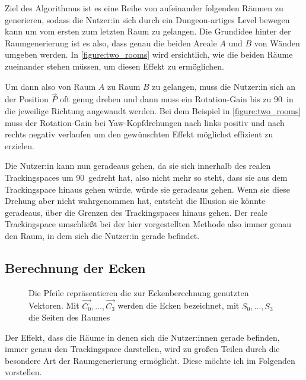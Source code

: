 Ziel des Algorithmus ist es eine Reihe von aufeinander folgenden Räumen zu generieren, sodass die Nutzer:in sich durch ein Dungeon-artiges Level bewegen kann um vom ersten zum letzten Raum zu gelangen.
Die Grundidee hinter der Raumgenerierung ist es also, dass genau die beiden Areale $A$ und $B$ von Wänden umgeben werden. %
In \autoref{figure:two_rooms} wird ersichtlich, wie die beiden Räume zueinander stehen müssen, um diesen Effekt zu ermöglichen.

Um dann also von Raum $A$ zu Raum $B$ zu gelangen, muss die Nutzer:in sich an der Position $\vec{P}$ oft genug drehen und dann muss ein Rotation-Gain bis zu 90\textdegree\ in die jeweilige Richtung angewandt werden. Bei dem Beispiel in \autoref{figure:two_rooms} muss der Rotation-Gain bei Yaw-Kopfdrehungen nach links positiv und nach rechts negativ verlaufen um den gewünschten Effekt möglichst effizient zu erzielen.

Die Nutzer:in kann nun geradeaus gehen, da sie sich innerhalb des realen Trackingspaces um 90\textdegree\ gedreht hat, also nicht mehr so steht, dass sie aus dem Trackingspace hinaus gehen würde, würde sie geradeaus gehen. Wenn sie diese Drehung aber nicht wahrgenommen hat, entsteht die Illusion sie könnte geradeaus, über die Grenzen des Trackingspaces hinaus gehen.
Der reale Trackingspace umschließt bei der hier vorgestellten Methode also immer genau den Raum, in dem sich die Nutzer:in gerade befindet.

\subsection{Berechnung der Ecken}
\label{subsection:calccorners}

\begin{figure}[H]
    \centering
    
    \caption{Die Pfeile repräsentieren die zur Eckenberechnung genutzten Vektoren. Mit $\vec{C_0}, ..., \vec{C_3}$ werden die Ecken bezeichnet, mit $S_{0}, ...,  S_3$ die Seiten des Raumes}
    \label{figure:calculateCornersFig}
\end{figure}

Der Effekt, dass die Räume in denen sich die Nutzer:innen gerade befinden, immer genau den Trackingspace darstellen, wird zu großen Teilen durch die besondere Art der Raumgenerierung ermöglicht. Diese möchte ich im Folgenden vorstellen.

